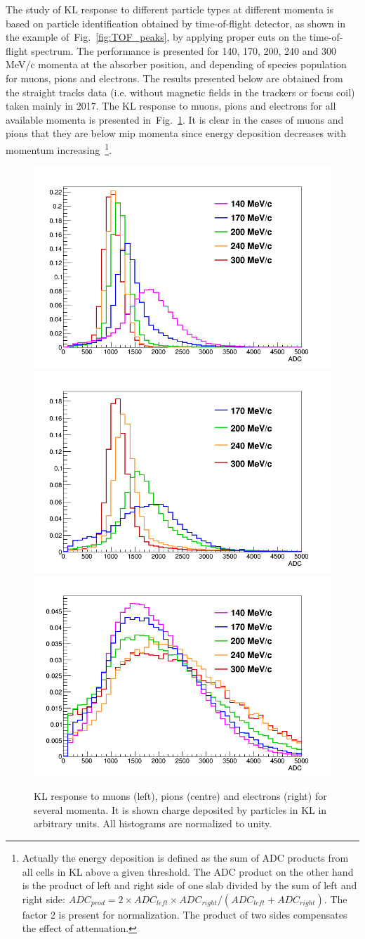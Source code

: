 The study of KL response to different particle types at different momenta is based on particle identification obtained by time-of-flight detector, as shown in the example of~Fig.~\ref{fig:TOF_peaks}, by applying proper cuts on the time-of-flight spectrum. The performance is presented for 140, 170, 200, 240 and 300 MeV/c momenta at the absorber position, and depending of species population for muons, pions and electrons. The results presented below are obtained from the straight tracks data (i.e. without magnetic fields in the trackers or focus coil) taken mainly in 2017. The KL response to muons, pions and electrons for all available momenta is presented in~Fig.~\ref{fig:KL_to_mu_pi_e}. It is clear in the cases of muons and pions that they are below mip momenta since energy deposition decreases with momentum increasing~\footnote{Actually the energy deposition is defined as the sum of ADC products from all cells in KL above a given threshold. The ADC product on the other hand is the product of left and right side of one slab divided by the sum of left and right side: $ADC_{prod} = 2 \times ADC_{left}  \times ADC_{right} / (ADC_{left} + ADC_{right})$. The factor 2 is present for normalization. The product of two sides compensates the effect of attenuation.}.
  \begin{figure}
	\begin{center}
  		\includegraphics[width=0.32\columnwidth]{./04-KL/Figures/muon.png}
  		\includegraphics[width=0.32\columnwidth]{./04-KL/Figures/pion.png}
  		\includegraphics[width=0.32\columnwidth]{./04-KL/Figures/electron.png}
  		\caption{KL response to muons (left), pions (centre) and electrons (right) for several momenta. It is shown charge deposited by particles in KL in arbitrary units. All histograms are normalized to unity.}
  		\label{fig:KL_to_mu_pi_e}
  	\end{center}
  \end{figure}

